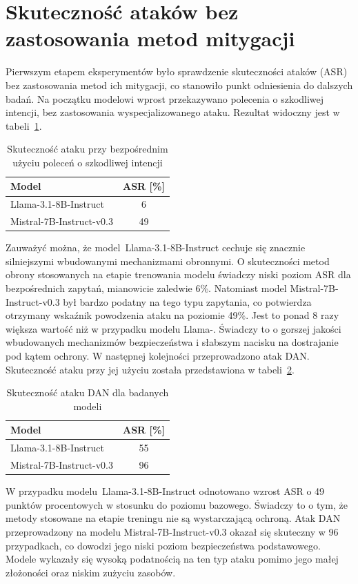 \section{Skuteczność ataków bez zastosowania metod mitygacji}
Pierwszym etapem eksperymentów było sprawdzenie skuteczności ataków (\gls{ASR}) bez zastosowania metod ich mitygacji, co stanowiło punkt odniesienia do dalszych badań. Na początku modelowi wprost przekazywano polecenia o szkodliwej intencji, bez zastosowania wyspecjalizowanego ataku. Rezultat widoczny jest w tabeli~\ref{tab:baseline_direct_prompts}.
\begin{table}[!ht]
    \centering
    \renewcommand{\arraystretch}{1.2}
    \begin{tabular}{l|c}
        \hline
        \textbf{Model}           & \textbf{ASR [\%]} \\\hline
        Llama-3.1-8B-Instruct    & 6                 \\\hline
        Mistral-7B-Instruct-v0.3 & 49                \\\hline
    \end{tabular}
    \caption{\label{tab:baseline_direct_prompts}Skuteczność ataku przy bezpośrednim użyciu poleceń o szkodliwej intencji}
\end{table}
Zauważyć można, że model~Llama-3.1-8B-Instruct cechuje się znacznie silniejszymi wbudowanymi mechanizmami obronnymi. O skuteczności metod obrony stosowanych na etapie trenowania modelu świadczy niski poziom \gls{ASR} dla bezpośrednich zapytań, mianowicie zaledwie 6\%. Natomiast model Mistral-7B-Instruct-v0.3 był bardzo podatny na tego typu zapytania, co potwierdza otrzymany wskaźnik powodzenia ataku na poziomie 49\%. Jest to ponad 8 razy większa wartość niż w przypadku modelu Llama-. Świadczy to o gorszej jakości wbudowanych mechanizmów bezpieczeństwa i słabszym nacisku na dostrajanie pod kątem ochrony.
W następnej kolejności przeprowadzono atak DAN. Skuteczność ataku przy jej użyciu została przedstawiona w tabeli~\ref{tab:dan_tab}.
\begin{table}[!ht]
    \centering
    \renewcommand{\arraystretch}{1.2}
    \begin{tabular}{l|c}
        \hline
        \textbf{Model}           & \textbf{ASR [\%]} \\\hline
        Llama-3.1-8B-Instruct    & 55                \\\hline
        Mistral-7B-Instruct-v0.3 & 96                \\\hline
    \end{tabular}
    \caption{\label{tab:dan_tab}Skuteczność ataku DAN dla badanych modeli}
\end{table}
W przypadku modelu~Llama-3.1-8B-Instruct odnotowano wzrost \gls{ASR} o 49 punktów procentowych w stosunku do poziomu bazowego. Świadczy to o tym, że metody stosowane na etapie treningu nie są wystarczającą ochroną. Atak \gls{DAN} przeprowadzony na modelu Mistral-7B-Instruct-v0.3 okazał się skuteczny w 96 przypadkach, co dowodzi jego niski poziom bezpieczeństwa podstawowego. Modele wykazały się wysoką podatnością na ten typ ataku pomimo jego małej złożoności oraz niskim zużyciu zasobów.


